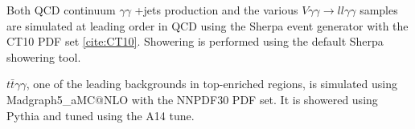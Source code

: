 Both QCD continuum $\gamma\gamma$ +jets production and the various $V\gamma\gamma \rightarrow ll\gamma\gamma$ samples are simulated at leading order in QCD using the Sherpa event generator with the CT10 PDF set \ref{cite:CT10}. Showering is performed using the default Sherpa showering tool. 

$t\bar{t}\gamma\gamma$, one of the leading backgrounds in top-enriched regions, is simulated using Madgraph5_aMC@NLO with the NNPDF30 PDF set. It is showered using Pythia and tuned using the A14 tune.


\begin{table}[h!]
  \centering
\caption{Summary of nominal background samples}
\label{tab:bckg_samples}
\end{table}  

